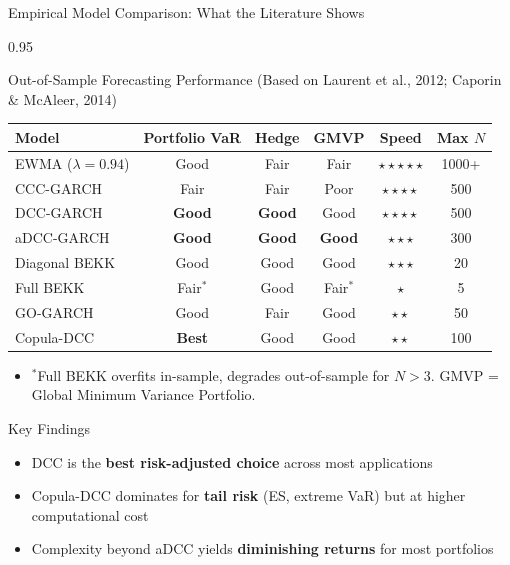 \documentclass[9pt, aspectratio=169, t]{beamer}
\begin{document}
\begin{frame}{Empirical Model Comparison: What the Literature Shows}
    \begin{cminipage}{0.95\textwidth}
    \vspace{-3mm}
    {\scriptsize
    \begin{block}{Out-of-Sample Forecasting Performance (Based on Laurent et al., 2012; Caporin \& McAleer, 2014)}
        \vspace{-1mm}
        \begin{center}
        \begin{tabular}{lccccc}
            \hline
            \textbf{Model} & \textbf{Portfolio VaR} & \textbf{Hedge} & \textbf{GMVP} & \textbf{Speed} & \textbf{Max $N$} \\
            \hline
            EWMA ($\lambda\!=\!0.94$) & Good & Fair & Fair & $\star\star\star\star\star$ & 1000+ \\
            CCC-GARCH & Fair & Fair & Poor & $\star\star\star\star$ & 500 \\
            DCC-GARCH & \textbf{Good} & \textbf{Good} & Good & $\star\star\star\star$ & 500 \\
            aDCC-GARCH & \textbf{Good} & \textbf{Good} & \textbf{Good} & $\star\star\star$ & 300 \\
            Diagonal BEKK & Good & Good & Good & $\star\star\star$ & 20 \\
            Full BEKK & Fair$^*$ & Good & Fair$^*$ & $\star$ & 5 \\
            GO-GARCH & Good & Fair & Good & $\star\star$ & 50 \\
            Copula-DCC & \textbf{Best} & Good & Good & $\star\star$ & 100 \\
            \hline
        \end{tabular}
        \end{center}
        \vspace{-2mm}
        \begin{itemize}\setlength{\itemsep}{0pt}
            \item $^*$Full BEKK overfits in-sample, degrades out-of-sample for $N > 3$. GMVP = Global Minimum Variance Portfolio.
        \end{itemize}
    \end{block}
    \vspace{-2mm}
    \begin{alertblock}{Key Findings}
        \begin{itemize}\setlength{\itemsep}{0pt}
            \item DCC is the \textbf{best risk-adjusted choice} across most applications
            \item Copula-DCC dominates for \textbf{tail risk} (ES, extreme VaR) but at higher computational cost
            \item Complexity beyond aDCC yields \textbf{diminishing returns} for most portfolios
        \end{itemize}
    \end{alertblock}
    }
    \end{cminipage}
\end{frame}
\end{document}
